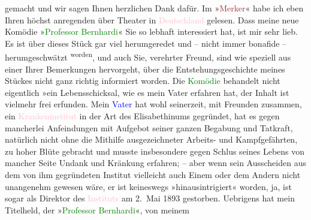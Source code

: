                gemacht und wir sagen Ihnen herzlichen Dank dafür.\pend
           \pstart
           Im »\textcolor{brown}{Merker}{}\ledrightnote{\textcolor{brown}{Der Merker}}« habe ich eben Ihren höchst anregenden
                  \label{K_L02114_2v}\label{K_L02114_2h} über Theater in \textcolor{pink}{Deutschland}{}\ledrightnote{\textcolor{pink}{Deutschland}} gelesen. Dass meine neue Komödie »\textcolor{green}{Professor Bernhardi}{}\ledrightnote{\textcolor{green}{Professor Bernhardi. Komödie in fünf Akten}}« Sie so lebhaft interessiert hat, ist mir sehr lieb. Es
               ist über dieses Stück gar viel herumgeredet und – nicht immer bonafide – herumgeschwätzt\substVorne{}\textsuperscript{ worden}{\allowbreak}\substDazwischen{},\substHinten{} und auch Sie, verehrter Freund, sind wie speziell aus einer Ihrer
               Bemerkungen hervorgeht, über die Entstehungsgeschichte meines Stückes nicht ganz
               richtig informiert worden. Die \textcolor{green}{Komödie}{} behandelt nicht eigentlich »ein Lebensschicksal, wie es mein Vater
               erfahren hat, der Inhalt ist vielmehr frei erfunden. Mein {\pb}\textcolor{blue}{Vater}{} hat wohl seinerzeit, mit
               Freunden zusammen, ein \textcolor{pink}{Krankeninstitut}{} in der Art des Elisabethinums gegründet, hat es gegen
               mancherlei Anfeindungen mit Aufgebot seiner ganzen Begabung und Tatkraft, natürlich
               nicht ohne die Mithilfe ausgezeichneter Arbeits- und Kampfgefährten, zu hoher Blüte
               gebracht und musste insbesondere gegen Schlus seines Lebens von mancher Seite Undank
               und Kränkung erfahren; – aber wenn sein Ausscheiden aus dem von ihm gegründeten
               Institut vielleicht auch Einem oder dem Andern nicht unangenehm gewesen wäre, er ist
               keineswegs »hinausintrigiert« worden, ja,  ist
               sogar als Direktor des \textcolor{pink}{Instituts}{} am
                  2. Mai 1893 gestorben. Uebrigens hat mein Titelheld, der »\textcolor{green}{Professor Bernhardi}{}«, von meinem
